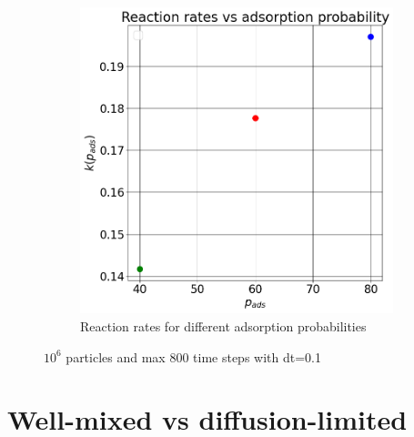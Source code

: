 \documentclass{article}
\begin{document}
\begin{figure}[htbp]
\begin{subfigure}[b]{0.48\textwidth}
        \includegraphics[width=\textwidth]{images/reactionVsProb.png}
        \caption{Reaction rates for different adsorption probabilities}
    \end{subfigure}
    \caption{$10^6$ particles and max 800 time steps with dt=0.1}
    \label{fig:reactionRatesDiffTau}
\end{figure}

\FloatBarrier  %
\section{Well-mixed vs diffusion-limited}
\end{document}
